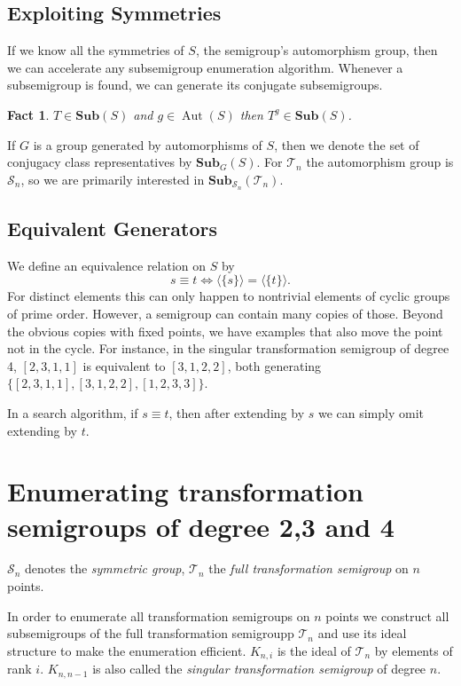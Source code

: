 \documentclass{amsart}
\newcommand{\cT}{{\mathcal T}}
\newcommand{\cS}{{\mathcal S}}
\newcommand{\Sub}{\mathbf{Sub}}
\DeclareMathOperator{\Aut}{Aut}
\theoremstyle{plain}
\newtheorem{fact}[theorem]{Fact}
\theoremstyle{definition}
\begin{document}
\subsection{Exploiting Symmetries}
If we know all the symmetries of $S$, the semigroup's automorphism group, then we can accelerate any subsemigroup enumeration algorithm.
Whenever a subsemigroup is found, we can generate its conjugate subsemigroups.
\begin{fact}
$T\in\Sub(S)$ and $g\in \Aut(S)$ then $T^g\in\Sub(S)$.%
\end{fact}

If $G$ is a group generated by automorphisms of $S$, then we denote the set of conjugacy class representatives by $\Sub_G(S)$. For $\cT_n$ the automorphism group is $\cS_n$, so we are primarily interested in $\Sub_{\cS_n}(\cT_n)$.


\subsection{Equivalent Generators}

We define an equivalence relation on $S$ by
$$ s\equiv t \Longleftrightarrow \langle\{s\} \rangle= \langle\{t\} \rangle.$$
For distinct elements this can only happen to nontrivial elements of cyclic groups of prime order.
However, a semigroup can contain many copies of those.
Beyond the obvious copies with fixed points, we have examples that also move the point not in the cycle. For instance, in the singular transformation semigroup of degree 4, $[ 2, 3, 1, 1 ]$ is equivalent to  $[ 3, 1, 2, 2 ]$, both generating $\{ [ 2, 3, 1, 1 ], [ 3, 1, 2, 2 ], [ 1, 2, 3, 3 ]\}$.

In a search algorithm, if $s\equiv t$, then after extending by $s$ we can simply omit extending by $t$.

\section{Enumerating transformation semigroups of degree 2,3 and 4}
\label{sec:fulltranssgp}

$\cS_n$ denotes the \emph{symmetric group}, $\cT_n$ the \emph{full transformation semigroup} on $n$ points.

In order to enumerate all transformation semigroups on $n$ points we construct all subsemigroups of the full transformation semigroupp $\cT_n$ and use its ideal structure to make the enumeration efficient.
$K_{n,i}$ is the ideal of $\cT_n$ by elements of rank $i$.
$K_{n,n-1}$ is also called the \emph{singular transformation semigroup} of degree $n$.
\end{document}
